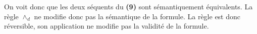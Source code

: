 \documentclass[11pt,letterpaper]{article}
\begin{document}
\vspace{10px}

On voit donc que les deux séquents du \textbf{(9)} sont sémantiquement équivalents. La règle $\land_{d}$ ne modifie donc pas la sémantique de la formule. La règle est donc réversible, son application ne modifie pas la validité de la formule. \\
\end{document}
